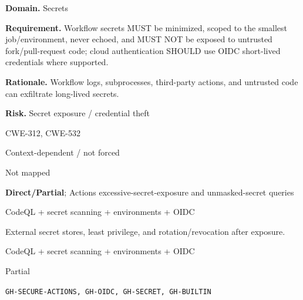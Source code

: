 \documentclass[10pt,letterpaper]{article}
\newcommand{\prioritybadge}[2]{\tcbox[on line,boxrule=0pt,arc=1.2mm,boxsep=0.7mm,left=1mm,right=1mm,top=0.4mm,bottom=0.4mm,colback=#2!12,coltext=#2]{\scriptsize\bfseries #1}}
\begin{document}
\begin{rulebox}[title={\texttt{SCS-ACTIONS-SECRET-001} \hfill \prioritybadge{Critical Control}{Critical}}]
\textbf{Domain.} Secrets

\textbf{Requirement.} Workflow secrets MUST be minimized, scoped to the smallest job/environment, never echoed, and MUST NOT be exposed to untrusted fork/pull-request code; cloud authentication SHOULD use OIDC short-lived credentials where supported.

\textbf{Rationale.} Workflow logs, subprocesses, third-party actions, and untrusted code can exfiltrate long-lived secrets.

\textbf{Risk.} Secret exposure / credential theft

\begin{description}[leftmargin=2.65cm,labelwidth=2.3cm,style=nextline,itemsep=1pt,topsep=3pt]
  \item[CWE] CWE-312, CWE-532
  \item[OWASP] Context-dependent / not forced
  \item[CERT] Not mapped
  \item[CodeQL] \textbf{Direct/Partial}; Actions excessive-secret-exposure and unmasked-secret queries
  \item[Enforcement] CodeQL + secret scanning + environments + OIDC
  \item[Prevention] External secret stores, least privilege, and rotation/revocation after exposure.
  \item[Verification] CodeQL + secret scanning + environments + OIDC
  \item[Automation] Partial
  \item[Sources] \texttt{GH-SECURE-ACTIONS, GH-OIDC, GH-SECRET, GH-BUILTIN}
\end{description}
\end{rulebox}
\end{document}
